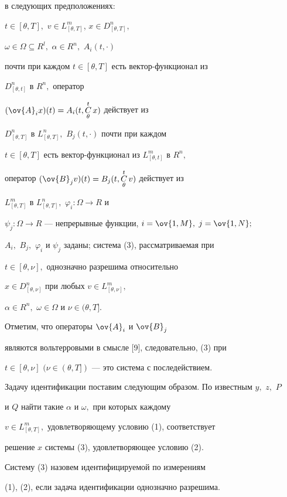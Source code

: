 в следующих предположениях:


$t\in[\theta,T],$ $v\in L^m_{[\theta,T]}$, $x\in D^n_{[\theta,T]},$


$\omega\in\Omega\subseteq R^l,$ $\alpha\in R^n,$ $A_i(t,\cdot)$


почти при каждом $t\in[\theta,T]$ есть вектор-функционал из


$D^n_{[\theta,t]}$ в $R^n,$ оператор


$(\ov{A}_i x)(t) = A_i(t,\updown{\theta}{t} x)$ действует из


$D^n_{[\theta,T]}$ в $L^n_{[\theta,T]},$ $B_j(t,\cdot)$ почти при каждом


$t\in[\theta,T]$ есть вектор-функционал из $L^m_{[\theta,t]}$ в $R^n,$


оператор $(\ov {B}_j v)(t) = B_j(t,\updown{\theta}{t} v)$ действует из


$L^m_{[\theta,T]}$ в $L^n_{[\theta,T]},$ $\varphi_i:\Omega\to R$ и


$\psi_j:\Omega\to R$ --- непрерывные функции, $i=\ov{1,M},$ $j=\ov{1,N};$


$A_i,$ $B_j,$ $\varphi_i$ и $\psi_j$ заданы; система (3), рассматриваемая при


$t\in[\theta,\nu],$ однозначно разрешима относительно


$x\in D^n_{[\theta,\nu]}$ при любых $v\in L^m_{[\theta,\nu]},$


$\alpha\in R^n,$ $\omega\in\Omega$ и $\nu\in(\theta,T].$





Отметим, что операторы $\ov{A}_i$ и $\ov{B}_j$


являются вольтерровыми в смысле [9], следовательно, (3) при


$t\in[\theta,\nu]$ $(\nu\in(\theta,T])$ --- это система с последействием.





Задачу идентификации поставим следующим образом. По известным $y,$ $z,$ $P$


и $Q$ найти такие $\alpha$ и $\omega,$ при которых каждому


$v\in L^m_{[\theta,T]},$ удовлетворяющему условию (1), соответствует


решение $x$ системы (3), удовлетворяющее условию (2).





\begin{defnnonum} Систему (3) назовем идентифицируемой по измерениям


(1), (2), если задача идентификации однозначно разрешима.


\end{defnnonum}





